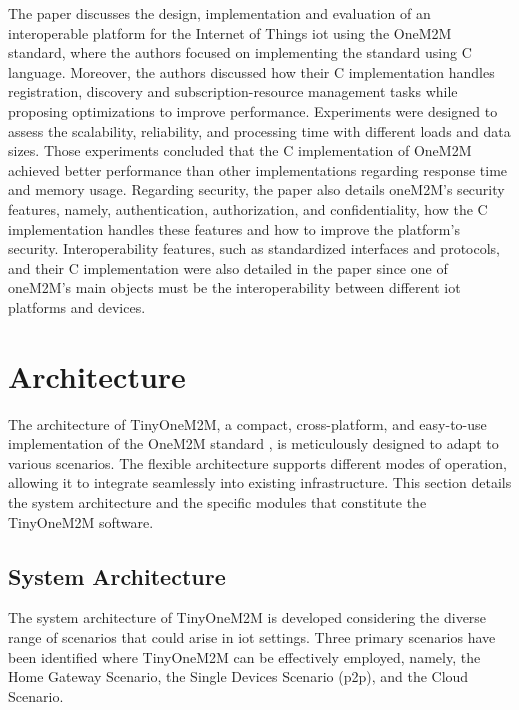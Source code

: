 \documentclass[a4paper,fleqn]{cas-dc}
\begin{document}
The paper \cite{Kim2018} discusses the design, implementation and evaluation of an interoperable platform for the Internet of Things \gls{iot} using the OneM2M standard, where the authors focused on implementing the standard using C language. Moreover, the authors discussed how their C implementation handles registration, discovery and subscription-resource management tasks while proposing optimizations to improve performance. Experiments were designed to assess the scalability, reliability, and processing time with different loads and data sizes. Those experiments concluded that the C implementation of OneM2M achieved better performance than other implementations regarding response time and memory usage. Regarding security, the paper also details oneM2M's security features, namely, authentication, authorization, and confidentiality, how the C implementation handles these features and how to improve the platform's security. Interoperability features, such as standardized interfaces and protocols, and their C implementation were also detailed in the paper since one of oneM2M's main objects must be the interoperability between different \gls{iot} platforms and devices.


\section{Architecture}
\label{architecture}

The architecture of TinyOneM2M, a compact, cross-platform, and easy-to-use implementation of the OneM2M standard \cite{onem2m_standard}, is meticulously designed to adapt to various scenarios. The flexible architecture supports different modes of operation, allowing it to integrate seamlessly into existing infrastructure. This section details the system architecture and the specific modules that constitute the TinyOneM2M software.

\subsection{System Architecture}

The system architecture of TinyOneM2M is developed considering the diverse range of scenarios that could arise in \gls{iot} settings. Three primary scenarios have been identified where TinyOneM2M can be effectively employed, namely, the Home Gateway Scenario, the Single Devices Scenario (\gls{p2p}), and the Cloud Scenario.
\end{document}
